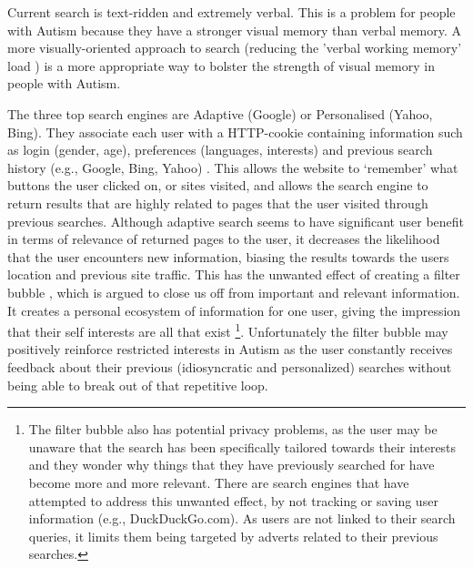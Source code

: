 \documentclass[a4paper, 10pt]{article}
\begin{document}
Current search is text-ridden and extremely verbal. This is a problem for people with Autism because they have a stronger visual memory \cite{fabienne} than verbal memory. A more visually-oriented approach to search (reducing the 'verbal working memory' load \cite{workingmem}) is a more appropriate way to bolster the strength of visual memory in people with Autism.

The three top search engines are Adaptive (Google) or Personalised (Yahoo, Bing). They associate each user with a HTTP-cookie containing information such as login (gender, age), preferences (languages, interests) and previous search history (e.g., Google, Bing, Yahoo) \cite{googlepersonalised, yahooadaptive, bingadaptive}. This allows the website to ‘remember’ what buttons the user clicked on, or sites visited, and allows the search engine to return results that are highly related to pages that the user visited through previous searches. Although adaptive search seems to have significant user benefit in terms of relevance of returned pages to the user, it decreases the likelihood that the user encounters new information, biasing the results towards the users location and previous site traffic.  This has the unwanted effect of creating a filter bubble \cite{Pariser}, which is argued to close us off from important and relevant information. It creates a personal ecosystem of information for one user, giving the impression that their self interests are all that exist \footnote{The filter bubble also has potential privacy problems, as the user may be unaware that the search has been specifically tailored towards their interests and they wonder why things that they have previously searched for have become more and more relevant. There are search engines that have attempted to address this unwanted effect, by not tracking or saving user information (e.g., DuckDuckGo.com). As users are not linked to their search queries, it limits them being targeted by adverts related to their previous searches.}. Unfortunately the filter bubble may positively reinforce restricted interests in Autism as the user constantly receives feedback about their previous (idiosyncratic and personalized) searches without being able to break out of that repetitive loop. 
\end{document}
